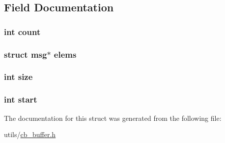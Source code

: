 \subsection{Field Documentation}
\hypertarget{struct_circular_buffer_ad43c3812e6d13e0518d9f8b8f463ffcf}{
\subsubsection[{count}]{\setlength{\rightskip}{0pt plus 5cm}int count}}\label{struct_circular_buffer_ad43c3812e6d13e0518d9f8b8f463ffcf}
\hypertarget{struct_circular_buffer_af8a90b36e277e8697e9b3f344ee24438}{
\subsubsection[{elems}]{\setlength{\rightskip}{0pt plus 5cm}struct {\bf msg}$\ast$ elems}}\label{struct_circular_buffer_af8a90b36e277e8697e9b3f344ee24438}
\hypertarget{struct_circular_buffer_a439227feff9d7f55384e8780cfc2eb82}{
\subsubsection[{size}]{\setlength{\rightskip}{0pt plus 5cm}int size}}\label{struct_circular_buffer_a439227feff9d7f55384e8780cfc2eb82}
\hypertarget{struct_circular_buffer_a37722a150250e2a5a98e5e0d11e53449}{
\subsubsection[{start}]{\setlength{\rightskip}{0pt plus 5cm}int start}}\label{struct_circular_buffer_a37722a150250e2a5a98e5e0d11e53449}


The documentation for this struct was generated from the following file\-:\begin{DoxyCompactItemize}
\item 
utils/\hyperlink{cb__buffer_8h}{cb\-\_\-buffer.\-h}\end{DoxyCompactItemize}
